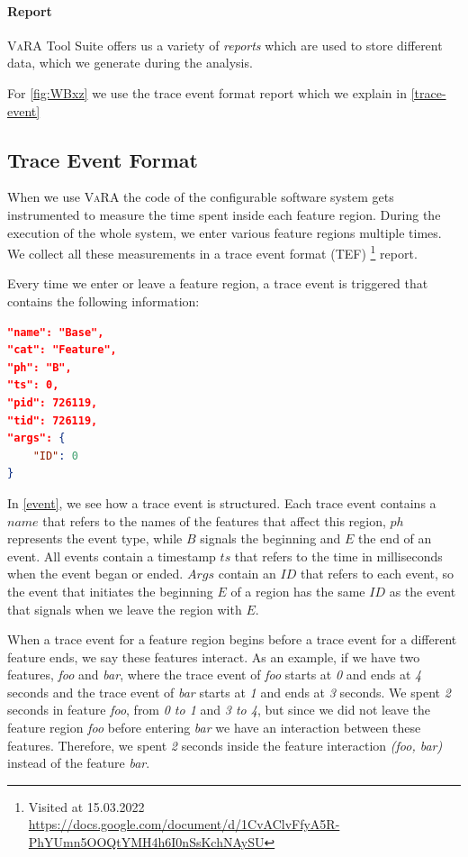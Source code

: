 \paragraph{Report}
\textsc{VaRA} Tool Suite offers us a variety of \emph{reports} which are used to store different data, which we generate during the analysis.

For \autoref{fig:WBxz} we use the trace event format report which we explain in \autoref{trace-event}


\subsection{Trace Event Format}\label{ch:trace-event}
When we use \textsc{VaRA} the code of the configurable software system gets instrumented to measure the time spent inside each feature region. 
During the execution of the whole system, we enter various feature regions multiple times.
We collect all these measurements
in a trace event format (TEF) \footnote{Visited at 15.03.2022 \\ \url{https://docs.google.com/document/d/1CvAClvFfyA5R-PhYUmn5OOQtYMH4h6I0nSsKchNAySU}} report.

Every time we enter or leave a feature region, a trace event is triggered that contains the following information:\\

\begin{minipage}{\linewidth}
\begin{lstlisting}[caption={Trace event},captionpos=b,language=json,firstnumber=1,label={event}]
"name": "Base",
"cat": "Feature",
"ph": "B",
"ts": 0,
"pid": 726119,
"tid": 726119,
"args": {
    "ID": 0
}
\end{lstlisting}
\end{minipage}
In \autoref{event}, we see how a trace event is structured. Each trace event contains a $name$ that refers to the names of the features that affect this
region, $ph$ represents the event type, while $B$ signals the beginning and $E$ the end of an event.
All events contain a timestamp $ts$ that refers to the time in milliseconds when the event began or ended.
$Args$ contain an $ID$ that refers to each event, so the event that initiates the beginning $E$ of a region has the same $ID$ as the event that signals when
we leave the region with $E$.

When a trace event for a feature region begins before a trace event for a different feature ends, we say these features interact. 
As an example, if we have two features, \emph{foo} and \emph{bar}, where the trace event of \emph{foo} starts at \emph{0} and ends at \emph{4} seconds 
and the trace event of \emph{bar} starts at \emph{1} and ends at \emph{3} seconds. We spent \emph{2} seconds in feature \emph{foo}, 
from \emph{0 to 1} and \emph{3 to 4}, 
but since we did not leave the feature region \emph{foo} before entering \emph{bar} we have an interaction between these features. 
Therefore, we spent \emph{2} seconds inside the feature interaction \emph{(foo, bar)} instead of the feature \emph{bar}.


